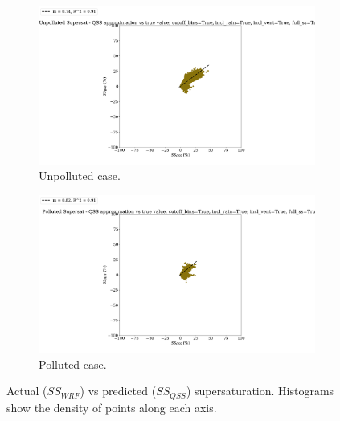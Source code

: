 \documentclass{article}
\begin{document}
\begin{figure}[ht]
	\centering
	\begin{subfigure}{0.7\textwidth}
		\includegraphics[width=\textwidth]{revmywrf/v12_ss_qss_vs_ss_wrf_Unpolluted_figure.png}
		\caption{Unpolluted case.}
		\label{wrfvsqssunpoll}
	\end{subfigure}
	\begin{subfigure}{0.7\textwidth}
		\includegraphics[width=\textwidth]{revmywrf/v12_ss_qss_vs_ss_wrf_Polluted_figure.png}
		\caption{Polluted case.}
		\label{wrfvsqsspoll}
	\end{subfigure}
	\caption{Actual ($SS_{WRF}$) vs predicted ($SS_{QSS}$) supersaturation. Histograms show the density of points along each axis.}
	\label{wrfvsqss}
\end{figure}
\end{document}
